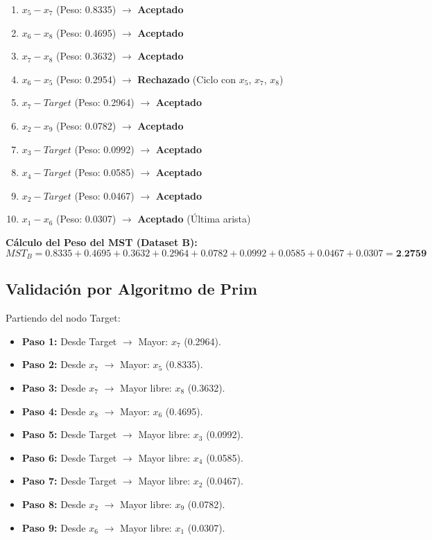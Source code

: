 \documentclass[12pt,a4paper]{article}
\begin{document}
\begin{enumerate}[label=\textbf{\arabic*.}]
    \item $x_5 - x_7$ (Peso: 0.8335) $\rightarrow$ \textbf{Aceptado}
    \item $x_6 - x_8$ (Peso: 0.4695) $\rightarrow$ \textbf{Aceptado}
    \item $x_7 - x_8$ (Peso: 0.3632) $\rightarrow$ \textbf{Aceptado}
    \item $x_6 - x_5$ (Peso: 0.2954) $\rightarrow$ \textbf{Rechazado} (Ciclo con $x_5$, $x_7$, $x_8$)
    \item $x_7 - Target$ (Peso: 0.2964) $\rightarrow$ \textbf{Aceptado}
    \item $x_2 - x_9$ (Peso: 0.0782) $\rightarrow$ \textbf{Aceptado}
    \item $x_3 - Target$ (Peso: 0.0992) $\rightarrow$ \textbf{Aceptado}
    \item $x_4 - Target$ (Peso: 0.0585) $\rightarrow$ \textbf{Aceptado}
    \item $x_2 - Target$ (Peso: 0.0467) $\rightarrow$ \textbf{Aceptado}
    \item $x_1 - x_6$ (Peso: 0.0307) $\rightarrow$ \textbf{Aceptado} (Última arista)
\end{enumerate}

\textbf{Cálculo del Peso del MST (Dataset B):}
\begin{equation}
    MST_B = 0.8335 + 0.4695 + 0.3632 + 0.2964 + 0.0782 + 0.0992 + 0.0585 + 0.0467 + 0.0307 = \textbf{2.2759}
\end{equation}

\subsection{Validación por Algoritmo de Prim}
Partiendo del nodo Target:

\begin{itemize}
    \item \textbf{Paso 1:} Desde Target $\rightarrow$ Mayor: \textbf{$x_7$} (0.2964).
    \item \textbf{Paso 2:} Desde $x_7$ $\rightarrow$ Mayor: \textbf{$x_5$} (0.8335).
    \item \textbf{Paso 3:} Desde $x_7$ $\rightarrow$ Mayor libre: \textbf{$x_8$} (0.3632).
    \item \textbf{Paso 4:} Desde $x_8$ $\rightarrow$ Mayor: \textbf{$x_6$} (0.4695).
    \item \textbf{Paso 5:} Desde Target $\rightarrow$ Mayor libre: \textbf{$x_3$} (0.0992).
    \item \textbf{Paso 6:} Desde Target $\rightarrow$ Mayor libre: \textbf{$x_4$} (0.0585).
    \item \textbf{Paso 7:} Desde Target $\rightarrow$ Mayor libre: \textbf{$x_2$} (0.0467).
    \item \textbf{Paso 8:} Desde $x_2$ $\rightarrow$ Mayor libre: \textbf{$x_9$} (0.0782).
    \item \textbf{Paso 9:} Desde $x_6$ $\rightarrow$ Mayor libre: \textbf{$x_1$} (0.0307).
\end{itemize}
\end{document}

